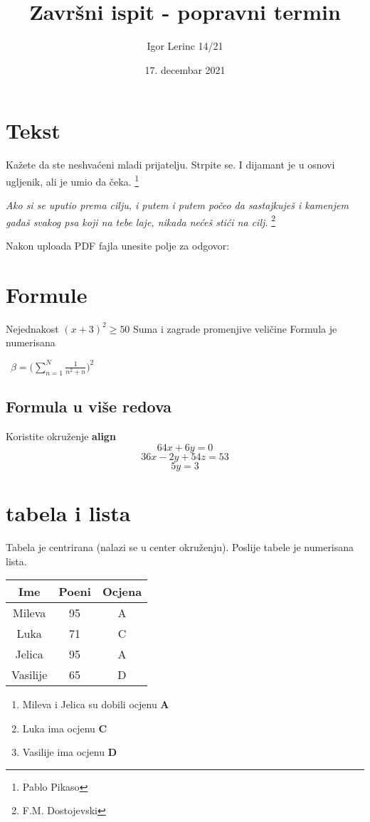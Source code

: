 \documentclass[12pt,a4paper, twocolumn] {article}
\begin{document}
\title{Završni ispit - popravni termin}
\author{Igor Lerinc 14/21}
\date{17. decembar 2021}
\maketitle


\section{Tekst}
Kažete da ste neshvaćeni mladi prijatelju. Strpite se. I dijamant je u osnovi ugljenik, ali je umio da čeka. \footnote{Pablo Pikaso}

\textit{Ako si se uputio prema cilju, i putem i putem počeo da sastajkuješ i kamenjem  gađaš svakog psa koji na tebe laje, nikada nećeš stići na cilj.} \footnote{F.M. Dostojevski}

Nakon uploada PDF fajla unesite polje za odgovor: %

\section{Formule}
Nejednakost $ (x+3)^2 \geq 50$
Suma i zagrade promenjive veličine
Formula je numerisana

\
$ \beta = \bigg(\sum_{n=1}^{N} \frac{1}{n^2 +n}\bigg)^2 $


\subsection{Formula u više redova}
Koristite okruženje \textbf{align}
$$ 64x + 6y = 0 $$
$$ 36x - 2y + 54z = 53 $$
$$ 5y=3 $$

\section{tabela i lista}
\medskip
Tabela je centrirana (nalazi se u center okruženju).
Poslije tabele je numerisana lista.


\begin{center}
\begin{tabular}{|c|c|c|}
\hline
\textbf{Ime} & \textbf{Poeni} & \textbf{Ocjena} \\
\hline
Mileva & 95 & A\\
\hline
Luka & 71 & C\\
\hline
Jelica & 95 & A \\
\hline
Vasilije & 65 & D\\
\hline
\end{tabular}
\end{center}


\begin{enumerate}
\item Mileva i Jelica su dobili ocjenu \textbf{A}
\item Luka ima ocjenu \textbf{C}
\item Vasilije ima ocjenu \textbf{D}


\end{enumerate}



\tableofcontents
\end{document}
